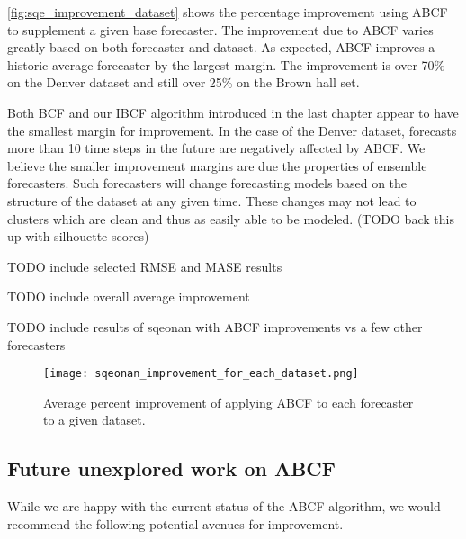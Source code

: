 \ref{fig:sqe_improvement_dataset} shows the percentage improvement using ABCF to supplement a given base forecaster.  The improvement due to ABCF varies greatly based on both forecaster and dataset.  As expected, ABCF improves a historic average forecaster by the largest margin.  The improvement is over 70\% on the Denver dataset and still over 25\% on the Brown hall set.

Both BCF and our IBCF algorithm introduced in the last chapter appear to have the smallest margin for improvement.  In the case of the Denver dataset, forecasts more than 10 time steps in the future are negatively affected by ABCF.  We believe the smaller improvement margins are due the properties of ensemble forecasters.  Such forecasters will change forecasting models based on the structure of the dataset at any given time.  These changes may not lead to clusters which are clean and thus as easily able to be modeled.  (TODO back this up with silhouette scores)

TODO include selected RMSE and MASE results

TODO include overall average improvement

TODO include results of sqeonan with ABCF improvements vs a few other forecasters


\begin{figure}
	\begin{center}
		\texttt{[image: sqeonan\_improvement\_for\_each\_dataset.png]}
	\end{center}
	\caption{Average percent improvement of applying ABCF to each forecaster to a given dataset.}
	\label{fig:sqeonan_improvement_all_dataset}
\end{figure}






\subsection{Future unexplored work on ABCF}
While we are happy with the current status of the ABCF algorithm, we would recommend the following potential avenues for improvement.

